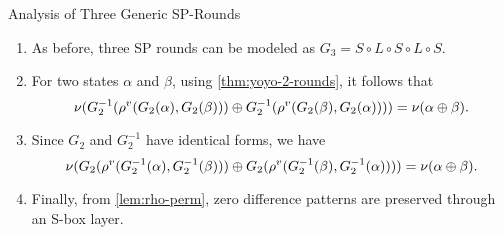 \documentclass[notheorems]{beamer}
\theoremstyle{definition}
\theoremstyle{example}
\begin{document}
    \begin{frame}[<+->]{Analysis of Three Generic SP-Rounds}
        \begin{enumerate}
            \item As before, three SP rounds can be modeled as \(G_3 = S \circ L
            \circ S \circ L \circ S\). 
            \item For two states \(\alpha\) and \(\beta\), using
            \cref{thm:yoyo-2-rounds}, it follows that
            \begin{equation}
                \nu(G_2^{-1}(\rho^v(G_2(\alpha), G_2(\beta))) \oplus G_2^{-1}(\rho^v(G_2(\beta), G_2(\alpha)))) = \nu(\alpha \oplus \beta).
            \end{equation}
            \item Since \(G_2\) and \(G_2^{-1}\) have identical forms, we have
            \begin{equation}
                \nu(G_2(\rho^v(G_2^{-1}(\alpha), G_2^{-1}(\beta))) \oplus G_2(\rho^v(G_2^{-1}(\beta), G_2^{-1}(\alpha)))) = \nu(\alpha \oplus \beta).
            \end{equation}
            \item Finally, from \cref{lem:rho-perm}, zero difference patterns
            are preserved through an S-box layer.
        \end{enumerate}
    \end{frame}
\end{document}
